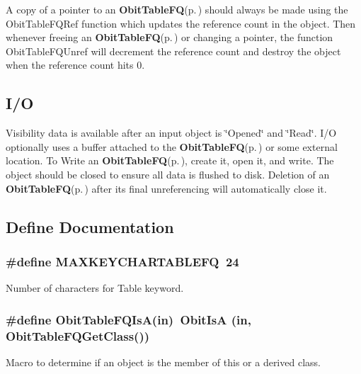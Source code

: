 A copy of a pointer to an {\bf Obit\-Table\-FQ}{\rm (p.\,\pageref{structObitTableFQ})} should always be made using the Obit\-Table\-FQRef function which updates the reference count in the object. Then whenever freeing an {\bf Obit\-Table\-FQ}{\rm (p.\,\pageref{structObitTableFQ})} or changing a pointer, the function Obit\-Table\-FQUnref will decrement the reference count and destroy the object when the reference count hits 0.\subsection{I/O}\label{ObitTableFQ_8h_ObitTableFQUsage}
Visibility data is available after an input object is \char`\"{}Opened\char`\"{} and \char`\"{}Read\char`\"{}. I/O optionally uses a buffer attached to the {\bf Obit\-Table\-FQ}{\rm (p.\,\pageref{structObitTableFQ})} or some external location. To Write an {\bf Obit\-Table\-FQ}{\rm (p.\,\pageref{structObitTableFQ})}, create it, open it, and write. The object should be closed to ensure all data is flushed to disk. Deletion of an {\bf Obit\-Table\-FQ}{\rm (p.\,\pageref{structObitTableFQ})} after its final unreferencing will automatically close it.

\subsection{Define Documentation}
\subsubsection{\setlength{\rightskip}{0pt plus 5cm}\#define MAXKEYCHARTABLEFQ\ 24}\label{ObitTableFQ_8h_a0}


Number of characters for Table keyword. 

\subsubsection{\setlength{\rightskip}{0pt plus 5cm}\#define Obit\-Table\-FQIs\-A(in)\ Obit\-Is\-A (in, Obit\-Table\-FQGet\-Class())}\label{ObitTableFQ_8h_a3}


Macro to determine if an object is the member of this or a derived class. 

